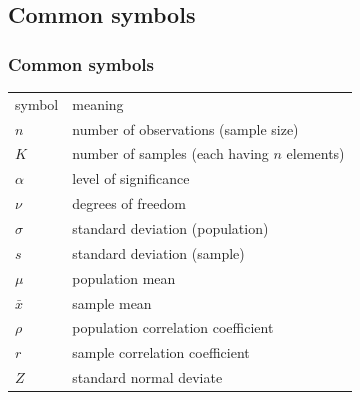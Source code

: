 \documentclass[xcolor={table}]{beamer}
\begin{document}
\subsection{Common symbols}
\begin{frame}\frametitle{Common symbols}
  \begin{tabular}{@{} >{\ttfamily}l l@{}} 
    \rowcolor{gray!40}symbol & meaning \\
    $n$ & number of observations (sample size)\\
    $K$ & number of samples (each having $n$ elements) \\
    $\alpha$ & level of significance \\
    $\nu$ & degrees of freedom \\
    $\sigma$ & standard deviation (population)\\
    $s$ & standard deviation (sample)\\
    $\mu$ & population mean \\
    $\bar{x}$ & sample mean \\
    $\rho $ & population correlation coefficient \\
    $r$ & sample correlation coefficient \\
    $Z$ & standard normal deviate \\
  \end{tabular}
\end{frame}
\end{document}
